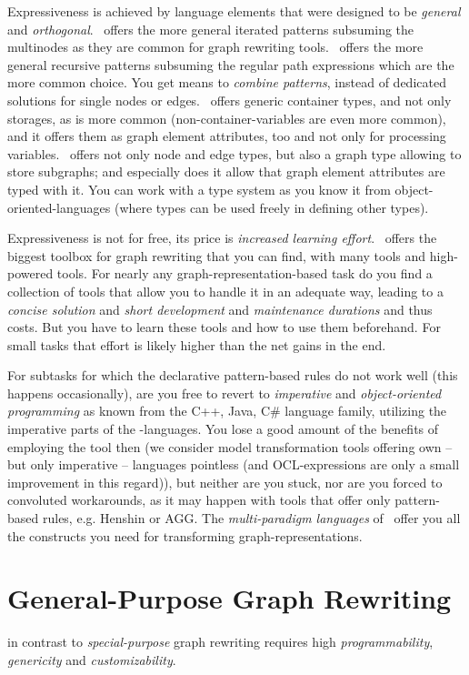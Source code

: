 Expressiveness is achieved by language elements that were designed to be \emph{general} and \emph{orthogonal}.
\GrG\ offers the more general iterated patterns subsuming the multinodes as they are common for graph rewriting tools.
\GrG\ offers the more general recursive patterns subsuming the regular path expressions which are the more common choice.
You get means to \emph{combine patterns}, instead of dedicated solutions for single nodes or edges.
\GrG\ offers generic container types, and not only storages, as is more common (non-container-variables are even more common), and it offers them as graph element attributes, too and not only for processing variables.
\GrG\ offers not only node and edge types, but also a graph type allowing to store subgraphs; and especially does it allow that graph element attributes are typed with it.
You can work with a type system as you know it from object-oriented-languages (where types can be used freely in defining other types).

Expressiveness is not for free, its price is \emph{increased learning effort}.
\GrG\ offers the biggest toolbox for graph rewriting that you can find, with many tools and high-powered tools.
For nearly any graph-representation-based task do you find a collection of tools that allow you to handle it in an adequate way, leading to a \emph{concise solution} and \emph{short development} and \emph{maintenance durations} and thus costs.
But you have to learn these tools and how to use them beforehand.
For small tasks that effort is likely higher than the net gains in the end.

For subtasks for which the declarative pattern-based rules do not work well (this happens occasionally), are you free to revert to \emph{imperative} and \emph{object-oriented programming} as known from the C++, Java, C\# language family, utilizing the imperative parts of the \GrG-languages.
You lose a good amount of the benefits of employing the tool then (we consider model transformation tools offering own -- but only imperative -- languages pointless (and OCL-expressions are only a small improvement in this regard)), but neither are you stuck, nor are you forced to convoluted workarounds, as it may happen with tools that offer only pattern-based rules, e.g. Henshin\cite{Henshin} or AGG\cite{agg}.
The \emph{multi-paradigm languages} of \GrG\ offer you all the constructs you need for transforming graph-representations.

\section{General-Purpose Graph Rewriting}
in contrast to \emph{special-purpose} graph rewriting requires high \emph{programmability}, \emph{genericity} and \emph{customizability}.


